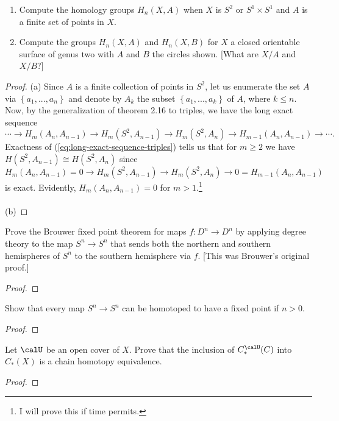 \begin{problem}[Hatcher {\S}2.1, Ex.\,17]
\begin{enumerate}[label=(\alph*)]
\item Compute the homology groups $H_n(X,A)$ when $X$ is $S^2$ or
  $S^1\times S^1$ and $A$ is a finite set of points in $X$.
\item Compute the groups $H_n(X,A)$ and $H_n(X,B)$ for $X$ a closed
  orientable surface of genus two with $A$ and $B$ the circles shown. [What
  are $X/A$ and $X/B$?]
\end{enumerate}
\end{problem}
\begin{proof}
(a) Since $A$ is a finite collection of points in $S^2$, let us enumerate
the set $A$ via $\left\{ a_1,...,a_n \right\}$ and denote by $A_k$ the
subset $\left\{a_1,...,a_k\right\}$ of $A$, where $k\leq n$. Now, by the
generalization of theorem 2.16 to triples, we have the long exact sequence
\begin{equation}
\label{eq:long-exact-sequence-triples}
\cdots\longrightarrow H_m(A_n,A_{n-1})\longrightarrow
H_m(S^2,A_{n-1})\longrightarrow H_m(S^2,A_n)
\longrightarrow H_{m-1}(A_n,A_{n-1})\longrightarrow\cdots.
\end{equation}
Exactness of (\ref{eq:long-exact-sequence-triples}) tells us that for
$m\geq 2$ we have $H(S^2,A_{n-1})\cong H(S^2,A_n)$ since
\[
H_m(A_n,A_{n-1})=0\longrightarrow H_m(S^2,A_{n-1})\longrightarrow
H_m(S^2,A_n)\longrightarrow 0=H_{m-1}(A_n,A_{n-1})
\]
is exact. Evidently, $H_m(A_n,A_{n-1})=0$ for $m>1$.\footnote{I will prove
  this if time permits.}
\\\\
(b)
\end{proof}
\newpage

\begin{problem}[Hatcher {\S}2.2, 1]
Prove the Brouwer fixed point theorem for maps $f\colon D^n\to D^n$ by applying
degree theory to the map $S^n\to S^n$ that sends both the northern and
southern hemispheres of $S^n$ to the southern hemisphere via $f$. [This was
Brouwer’s original proof.]
\end{problem}
\begin{proof}
\end{proof}
\newpage

\begin{problem}[Hatcher {\S}2.2, 6]
Show that every map $S^n\to S^n$ can be homotoped to have a fixed point
if $n>0$.
\end{problem}
\begin{proof}
\end{proof}
\newpage

\begin{problem}
Let $\calU$ be an open cover of $X$. Prove that the inclusion of
$C_*^{\calU}(C)$ into $C_*(X)$ is a chain homotopy equivalence.
\end{problem}
\begin{proof}
\end{proof}

